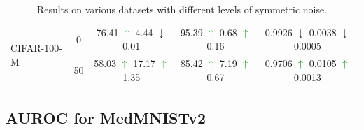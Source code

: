 \documentclass{article}
\theoremstyle{plain}
\theoremstyle{definition}
\theoremstyle{remark}
\begin{document}
\begin{table}[h!]
{\begin{tabular}{l|cccc}
\multirow{2}{*}{CIFAR-100-M} & 0 & \hspace{0.5em}76.41 \textcolor{Green}{$\uparrow$} \hspace{0.5em}4.44 \textcolor{BrickRed}{$\downarrow$} 0.01\hspace{0.5em} & \hspace{0.5em}95.39 \textcolor{Green}{$\uparrow$} 0.68 \textcolor{Green}{$\uparrow$} 0.16\hspace{0.5em} & 0.9926 \textcolor{BrickRed}{$\downarrow$} 0.0038 \textcolor{BrickRed}{$\downarrow$} 0.0005 \\ & 50 & 58.03 \textcolor{Green}{$\uparrow$} 17.17 \textcolor{Green}{$\uparrow$} 1.35 & \hspace{0.5em}85.42 \textcolor{Green}{$\uparrow$} 7.19 \textcolor{Green}{$\uparrow$} 0.67\hspace{0.5em} & 0.9706 \textcolor{Green}{$\uparrow$} 0.0105 \textcolor{Green}{$\uparrow$} 0.0013 \\ \hline
\end{tabular}} \caption{Results on various datasets with different levels of symmetric noise. \label{table:datasets}} \end{table}

\subsection{AUROC for MedMNISTv2}
\label{supp:medmnist}
\end{document}
